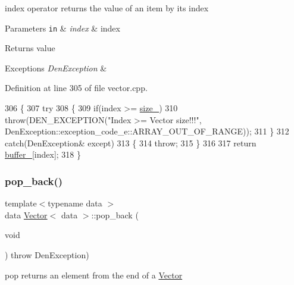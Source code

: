 index operator  returns the value of an item by its index 


\begin{DoxyParams}[1]{Parameters}
\mbox{\tt in}  & {\em index} & index \\
\hline
\end{DoxyParams}
\begin{DoxyReturn}{Returns}
value 
\end{DoxyReturn}

\begin{DoxyExceptions}{Exceptions}
{\em Den\+Exception} & \\
\hline
\end{DoxyExceptions}


Definition at line 305 of file vector.\+cpp.


\begin{DoxyCode}
306     \{
307         \textcolor{keywordflow}{try}
308             \{
309                 \textcolor{keywordflow}{if}(index >= \hyperlink{classVector_a3c70fa478530a90177f2a7e7621ee688}{size\_})
310                     \textcolor{keywordflow}{throw}(DEN\_EXCEPTION(\textcolor{stringliteral}{"Index >= Vector size!!!"}, 
      DenException::exception\_code\_e::ARRAY\_OUT\_OF\_RANGE));
311             \}
312         \textcolor{keywordflow}{catch}(DenException& except)
313             \{
314                 \textcolor{keywordflow}{throw};
315             \}
316 
317         \textcolor{keywordflow}{return} \hyperlink{classVector_a22db58ae9e92c6014e8ac657804a035a}{buffer\_}[index];
318     \}
\end{DoxyCode}
\mbox{\label{classVector_af58fb997ed40663eb1e9f17b96cbc846}} 
\subsubsection{\texorpdfstring{pop\+\_\+back()}{pop\_back()}}
{\footnotesize\ttfamily template$<$typename data $>$ \\
data \hyperlink{classVector}{Vector}$<$ data $>$\+::pop\+\_\+back (\begin{DoxyParamCaption}\item[{void}]{ }\end{DoxyParamCaption}) throw  Den\+Exception) }



pop  returns an element from the end of a \hyperlink{classVector}{Vector} 

